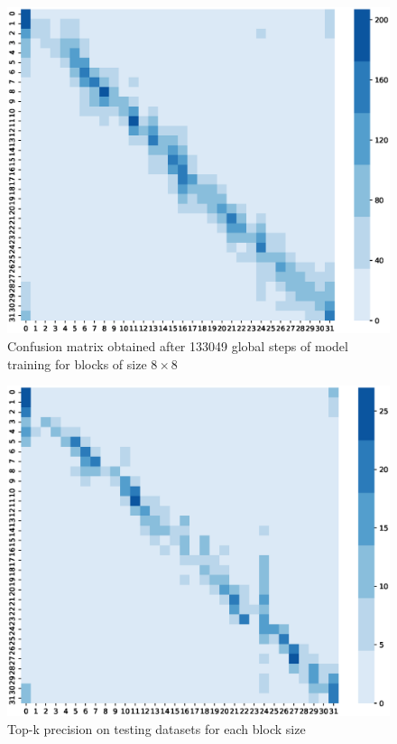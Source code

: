 \begin{figure}
    \centering
    \includegraphics[width=\textwidth,height=\textheight,keepaspectratio]{Figures/confusion-matrix/08-kpt-133049.eps}
    \caption[Confusion matrix obtained after 133049 global steps of model training for blocks of size \(8\times8\)]
    {Confusion matrix obtained after 133049 global steps of model training for blocks of size \(8\times8\)}\label{fig:cm8times8}
\end{figure}

\begin{figure}
    \centering
    \includegraphics[width=\textwidth,height=\textheight,keepaspectratio]{Figures/confusion-matrix/16-kpt-304857.eps}
    \caption[Top-k precision on testing datasets for each block size]
    {Top-k precision on testing datasets for each block size}\label{fig:cm16times16}
\end{figure}

